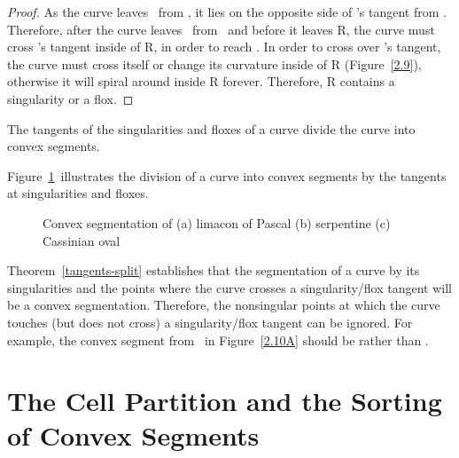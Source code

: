\begin{proof}
%
As the curve leaves \xotha\ from \xo,
it lies on the opposite side of \xo's tangent from \seg{\xo\xth}.
Therefore, after the curve leaves \xotha\ from \xo\ and before it leaves
R, the curve must cross \xo's tangent inside of R, in order to reach 
\seg{\xo\xth}.
In order to cross over \xo's tangent, the curve
must cross itself or change its curvature inside of R (Figure~\ref{2.9}),
otherwise it will spiral around inside R forever.
Therefore, R contains a singularity or a flox.
\end{proof}
%

\begin{corollary}
The tangents of the singularities and floxes of a curve divide the curve
into convex segments.
\end{corollary}

\begin{example}
\label{eg-2.2.2}
Figure~\ref{2.10}\ illustrates the division of a curve into
convex segments by the tangents at singularities and floxes.
\end{example}
\begin{figure}[htbp]\vspace{4.75in}
\caption{Convex segmentation of (a) limacon of Pascal (b) serpentine (c) Cassinian oval}
\label{2.10}\end{figure}

Theorem~\ref{tangents-split} establishes that
the segmentation of a curve by its singularities and the 
points where the
curve crosses a singularity/flox tangent will be a convex segmentation.
Therefore, the nonsingular points at which the curve touches (but does not
cross) a singularity/flox tangent can be ignored.
For example, the convex segment from \wo\ in Figure~\ref{2.10A} should be
 rather than .
%
\section{The Cell Partition and the Sorting of Convex Segments}
